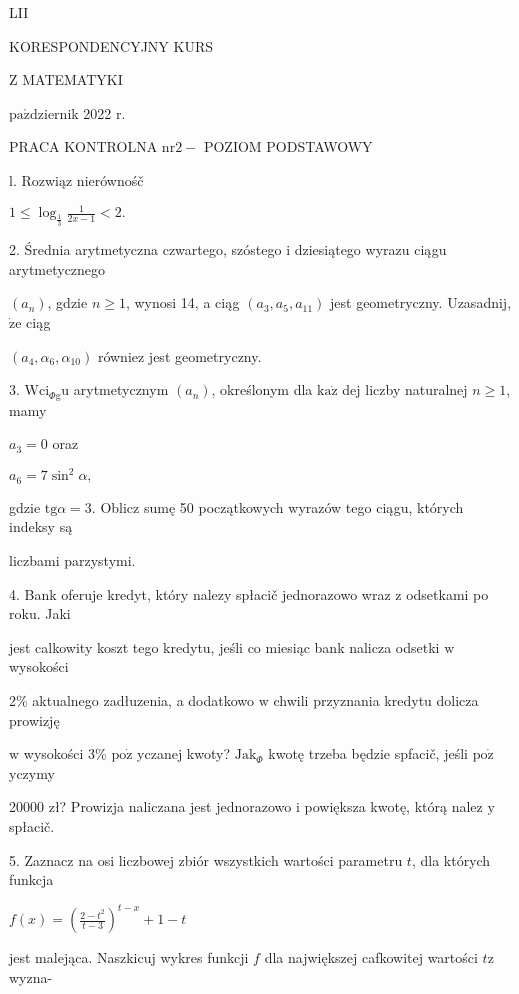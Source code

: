 \documentclass[a4paper,12pt]{article}
\begin{document}
LII

KORESPONDENCYJNY KURS

Z MATEMATYKI

$\mathrm{p}\mathrm{a}\acute{\mathrm{z}}$dziernik 2022 $\mathrm{r}.$

PRACA KONTROLNA $\mathrm{n}\mathrm{r} 2-$ POZIOM PODSTAWOWY

l. Rozwiąz nierównośč

$1\displaystyle \leq\log_{\frac{1}{3}}\frac{1}{2x-1}<2.$

2. Średnia arytmetyczna czwartego, szóstego $\mathrm{i}$ dziesiątego wyrazu ciągu arytmetycznego

$(a_{n})$, gdzie $ n\geq 1$, wynosi 14, a ciąg $(a_{3},a_{5},a_{11})$ jest geometryczny. Uzasadnij, $\dot{\mathrm{z}}\mathrm{e}$ ciąg

$(a_{4},\alpha_{6},\alpha_{10})$ równiez jest geometryczny.

3. $\mathrm{W}\mathrm{c}\mathrm{i}_{\Phi \mathrm{g}}\mathrm{u}$ arytmetycznym $(a_{n})$, określonym dla $\mathrm{k}\mathrm{a}\dot{\mathrm{z}}$ dej liczby naturalnej $n\geq 1$, mamy

$a_{3}=0$ oraz

$a_{6}=7\sin^{2}\alpha,$

gdzie $\mathrm{t}\mathrm{g}\alpha=3$. Oblicz sumę 50 początkowych wyrazów tego ciągu, których indeksy są

liczbami parzystymi.

4. Bank oferuje kredyt, który nalezy spłacič jednorazowo wraz $\mathrm{z}$ odsetkami po roku. Jaki

jest calkowity koszt tego kredytu, jeśli co miesiąc bank nalicza odsetki $\mathrm{w}$ wysokości

2\% aktualnego zadłuzenia, a dodatkowo $\mathrm{w}$ chwili przyznania kredytu dolicza prowizję

$\mathrm{w}$ wysokości 3\% $\mathrm{p}\mathrm{o}\dot{\mathrm{z}}$ yczanej kwoty? $\mathrm{J}\mathrm{a}\mathrm{k}_{\Phi}$ kwotę trzeba będzie spfacič, jeśli $\mathrm{p}\mathrm{o}\dot{\mathrm{z}}$ yczymy

20000 zł? Prowizja naliczana jest jednorazowo $\mathrm{i}$ powiększa kwotę, którą nalez $\mathrm{y}$ spłacič.

5. Zaznacz na osi liczbowej zbiór wszystkich wartości parametru $t$, dla których funkcja

$f(x)=(\displaystyle \frac{2-t^{2}}{t-3})^{t-x}+1-t$

jest malejąca. Naszkicuj wykres funkcji $f$ dla największej cafkowitej wartości $t\mathrm{z}$ wyzna-
\end{document}
